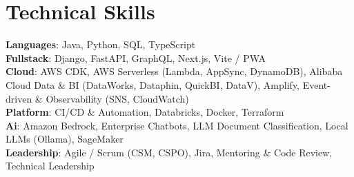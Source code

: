 \section{Technical Skills}
 \begin{itemize}[leftmargin=0.15in, label={}]
    \small{\item{
     \textbf{Languages}{: Java, Python, SQL, TypeScript} \\
     \textbf{Fullstack}{: Django, FastAPI, GraphQL, Next.js, Vite / PWA} \\
     \textbf{Cloud}{: AWS CDK, AWS Serverless (Lambda, AppSync, DynamoDB), Alibaba Cloud Data \& BI (DataWorks, Dataphin, QuickBI, DataV), Amplify, Event-driven \& Observability (SNS, CloudWatch)} \\
     \textbf{Platform}{: CI/CD \& Automation, Databricks, Docker, Terraform} \\
     \textbf{Ai}{: Amazon Bedrock, Enterprise Chatbots, LLM Document Classification, Local LLMs (Ollama), SageMaker} \\
     \textbf{Leadership}{: Agile / Scrum (CSM, CSPO), Jira, Mentoring \& Code Review, Technical Leadership} \\
    }}
 \end{itemize}